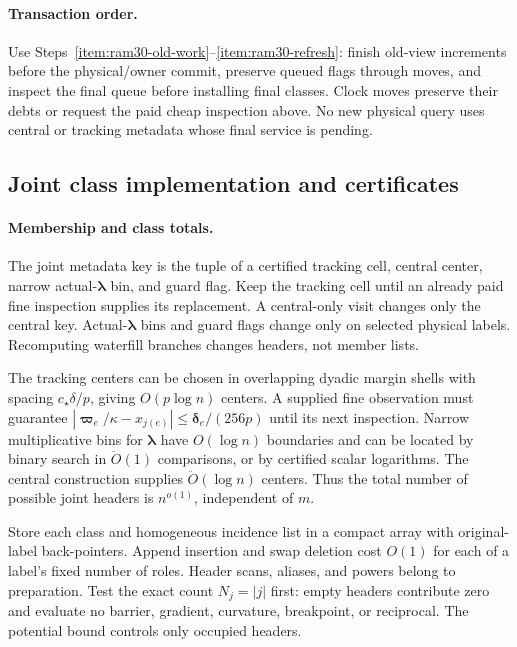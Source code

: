 \documentclass[11pt]{article}
\theoremstyle{remark}
\newcommand{\llambda}{\boldsymbol{\lambda}}
\newcommand{\vvp}{\boldsymbol{\varpi}}
\newcommand{\ddelta}{\boldsymbol{\delta}}
\renewcommand{\O}{\ddot{O}}
\begin{document}
\paragraph{Transaction order.}
Use Steps~\ref{item:ram30-old-work}--\ref{item:ram30-refresh}: finish old-view
increments before the physical/owner commit, preserve queued flags through
moves, and inspect the final queue before installing final classes.
Clock moves preserve their debts or request the paid cheap inspection above.
No new physical query uses central or tracking metadata whose final service is
pending.

\subsection{Joint class implementation and certificates}
\label{sec:ram30-joint-classes}

\paragraph{Membership and class totals.}
The joint metadata key is the tuple of a certified tracking cell, central
center, narrow actual-$\llambda$ bin, and guard flag.
Keep the tracking cell until an already paid fine inspection supplies its
replacement.
A central-only visit changes only the central key.
Actual-$\llambda$ bins and guard flags change only on selected physical labels.
Recomputing waterfill branches changes headers, not member lists.

The tracking centers can be chosen in overlapping dyadic margin shells with
spacing $c_\star\delta/p$, giving $O(p\log n)$ centers.
A supplied fine observation must guarantee
$|\vvp_e/\kappa-x_{j(e)}|\le\ddelta_e/(256p)$ until its next inspection.
Narrow multiplicative bins for $\llambda$ have $O(\log n)$ boundaries and can be
located by binary search in $\O(1)$ comparisons, or by certified scalar
logarithms.
The central construction supplies $\O(\log n)$ centers.
Thus the total number of possible joint headers is $n^{o(1)}$, independent of
$m$.

Store each class and homogeneous incidence list in a compact array with
original-label back-pointers.
Append insertion and swap deletion cost $O(1)$ for each of a label's fixed
number of roles.
Header scans, aliases, and powers belong to preparation.
Test the exact count $N_j=|j|$ first: empty headers contribute zero and evaluate
no barrier, gradient, curvature, breakpoint, or reciprocal.
The potential bound controls only occupied headers.
\end{document}
